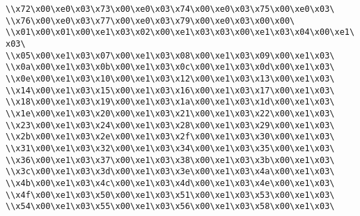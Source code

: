 \verb|\\x72\x00\xe0\x03\x73\x00\xe0\x03\x74\x00\xe0\x03\x75\x00\xe0\x03\|\newline
\verb|\\x76\x00\xe0\x03\x77\x00\xe0\x03\x79\x00\xe0\x03\x00\x00\|\newline
\verb|\\x01\x00\x01\x00\xe1\x03\x02\x00\xe1\x03\x03\x00\xe1\x03\x04\x00\xe1\x03\|\newline
\verb|\\x05\x00\xe1\x03\x07\x00\xe1\x03\x08\x00\xe1\x03\x09\x00\xe1\x03\|\newline
\verb|\\x0a\x00\xe1\x03\x0b\x00\xe1\x03\x0c\x00\xe1\x03\x0d\x00\xe1\x03\|\newline
\verb|\\x0e\x00\xe1\x03\x10\x00\xe1\x03\x12\x00\xe1\x03\x13\x00\xe1\x03\|\newline
\verb|\\x14\x00\xe1\x03\x15\x00\xe1\x03\x16\x00\xe1\x03\x17\x00\xe1\x03\|\newline
\verb|\\x18\x00\xe1\x03\x19\x00\xe1\x03\x1a\x00\xe1\x03\x1d\x00\xe1\x03\|\newline
\verb|\\x1e\x00\xe1\x03\x20\x00\xe1\x03\x21\x00\xe1\x03\x22\x00\xe1\x03\|\newline
\verb|\\x23\x00\xe1\x03\x24\x00\xe1\x03\x28\x00\xe1\x03\x29\x00\xe1\x03\|\newline
\verb|\\x2b\x00\xe1\x03\x2e\x00\xe1\x03\x2f\x00\xe1\x03\x30\x00\xe1\x03\|\newline
\verb|\\x31\x00\xe1\x03\x32\x00\xe1\x03\x34\x00\xe1\x03\x35\x00\xe1\x03\|\newline
\verb|\\x36\x00\xe1\x03\x37\x00\xe1\x03\x38\x00\xe1\x03\x3b\x00\xe1\x03\|\newline
\verb|\\x3c\x00\xe1\x03\x3d\x00\xe1\x03\x3e\x00\xe1\x03\x4a\x00\xe1\x03\|\newline
\verb|\\x4b\x00\xe1\x03\x4c\x00\xe1\x03\x4d\x00\xe1\x03\x4e\x00\xe1\x03\|\newline
\verb|\\x4f\x00\xe1\x03\x50\x00\xe1\x03\x51\x00\xe1\x03\x53\x00\xe1\x03\|\newline
\verb|\\x54\x00\xe1\x03\x55\x00\xe1\x03\x56\x00\xe1\x03\x58\x00\xe1\x03\|\newline
